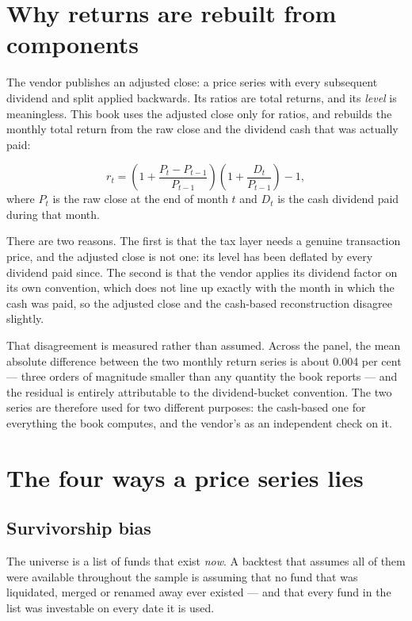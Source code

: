 \section{Why returns are rebuilt from components}

The vendor publishes an adjusted close: a price series with every
subsequent dividend and split applied backwards. Its ratios are total
returns, and its \emph{level} is meaningless. This book uses the adjusted
close only for ratios, and rebuilds the monthly total return from the raw
close and the dividend cash that was actually paid:

\begin{equation}
r_t = \left(1 + \frac{P_t - P_{t-1}}{P_{t-1}}\right)
      \left(1 + \frac{D_t}{P_{t-1}}\right) - 1,
\end{equation}
where \(P_t\) is the raw close at the end of month \(t\) and \(D_t\) is the
cash dividend paid during that month.

There are two reasons. The first is that the tax layer needs a genuine
transaction price, and the adjusted close is not one: its level has been
deflated by every dividend paid since. The second is that the vendor
applies its dividend factor on its own convention, which does not line up
exactly with the month in which the cash was paid, so the adjusted close
and the cash-based reconstruction disagree slightly.

That disagreement is measured rather than assumed. Across the panel, the
mean absolute difference between the two monthly return series is about
0.004 per cent --- three orders of magnitude smaller than any quantity the
book reports --- and the residual is entirely attributable to the
dividend-bucket convention. The two series are therefore used for two
different purposes: the cash-based one for everything the book computes,
and the vendor's as an independent check on it.

\section{The four ways a price series lies}

\subsection{Survivorship bias}

The universe is a list of funds that exist \emph{now}. A backtest that
assumes all of them were available throughout the sample is assuming that
no fund that was liquidated, merged or renamed away ever existed --- and
that every fund in the list was investable on every date it is used.

